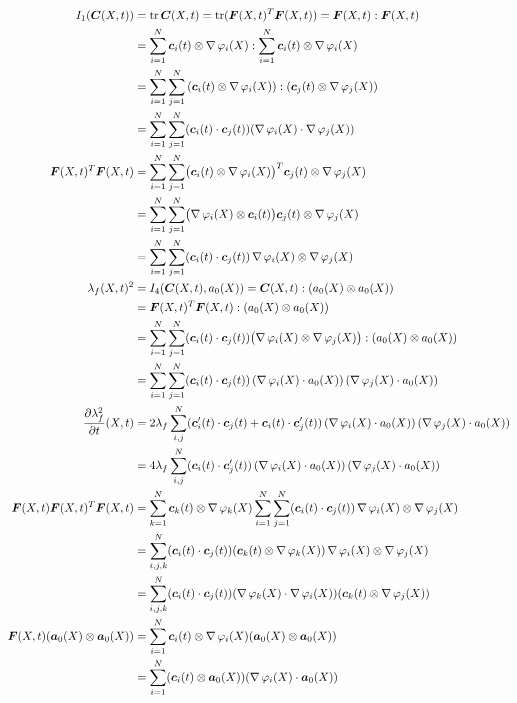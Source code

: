 \begin{align}
	I_1(\vC(X,t)) &= \tr\vC(X,t) = \tr(\vF(X,t)^T\vF(X,t)) = \vF(X,t) : \vF(X,t)\nonumber\\
	&= \sumi \vc_i(t)\otimes \divergence\varphi_i(X) : \sumi \vc_i(t)\otimes \divergence\varphi_i(X)\nonumber\\
	&= \sumi\sumj \left(\vc_i(t)\otimes \divergence\varphi_i(X)\right) : (\vc_j(t)\otimes \divergence\varphi_j(X))\nonumber\\
	&= \sumi\sumj (\vc_i(t) \cdot \vc_j(t))(\divergence\varphi_i(X) \cdot \divergence\varphi_j(X))\label{eq:I1_basis}\\
	\vF(X,t)^T\vF(X,t) &= \sumi\sumj \bigl(\vc_i(t)\otimes\divergence\varphi_i(X)\bigr)^T\vc_j(t)\otimes\divergence\varphi_j(X)\nonumber\\
	 &= \sumi\sumj \bigl(\divergence\varphi_i(X)\otimes\vc_i(t)\bigr)\vc_j(t)\otimes\divergence\varphi_j(X)\nonumber\\
	 &=\sumi\sumj (\vc_i(t)\cdot \vc_j(t))\divergence\varphi_i(X)\otimes\divergence\varphi_j(X)\nonumber\\
	\lambda_f(X,t)^2 &=I_4(\vC(X,t),a_0(X)) = \vC(X,t):(a_0(X)\otimes a_0(X))\nonumber\\
			&=  \vF(X,t)^T\vF(X,t) : (a_0(X)\otimes a_0(X))\nonumber\\
			&=  \sumi\sumj (\vc_i(t)\cdot \vc_j(t))\bigl(\divergence\varphi_i(X)\otimes\divergence\varphi_j(X)\bigr) : (a_0(X)\otimes a_0(X))\nonumber\\
			&=  \sumi\sumj (\vc_i(t)\cdot \vc_j(t))\left(\divergence\varphi_i(X)\cdot a_0(X)\right)(\divergence\varphi_j(X)\cdot a_0(X))\label{eq:lambdaf_basis}\\
	\d{\lambda_f^2}{t}(X,t) &= 2\lambda_f \suml{i,j}{N} (\vc'_i(t)\cdot \vc_j(t) + \vc_i(t)\cdot \vc'_j(t))\left(\divergence\varphi_i(X)\cdot a_0(X)\right)(\divergence\varphi_j(X)\cdot a_0(X))\nonumber\\
		&= 4\lambda_f \suml{i,j}{N} (\vc_i(t)\cdot \vc'_j(t))\left(\divergence\varphi_i(X)\cdot a_0(X)\right)(\divergence\varphi_j(X)\cdot a_0(X))\nonumber\\
    \vF(X,t)\vF(X,t)^T\vF(X,t) &= \sumk\vc_k(t)\otimes\divergence\varphi_k(X)\sumi\sumj (\vc_i(t)\cdot \vc_j(t))\divergence\varphi_i(X)\otimes\divergence\varphi_j(X)\nonumber\\
    	&= \suml{i,j,k}{N}(\vc_i(t)\cdot \vc_j(t))(\vc_k(t)\otimes\divergence\varphi_k(X))\divergence\varphi_i(X)\otimes\divergence\varphi_j(X)\nonumber\\
    	&= \suml{i,j,k}{N}(\vc_i(t)\cdot \vc_j(t))(\divergence\varphi_k(X)\cdot\divergence\varphi_i(X))(\vc_k(t)\otimes\divergence\varphi_j(X))\nonumber\\
    \vF(X,t)(\va_0(X)\otimes\va_0(X)) &= \sumi \vc_i(t)\otimes \divergence\varphi_i(X)(\va_0(X)\otimes\va_0(X))\nonumber\\
    &= \sumi (\vc_i(t)\otimes \va_0(X))(\divergence\varphi_i(X)\cdot\va_0(X))\nonumber
\end{align}

